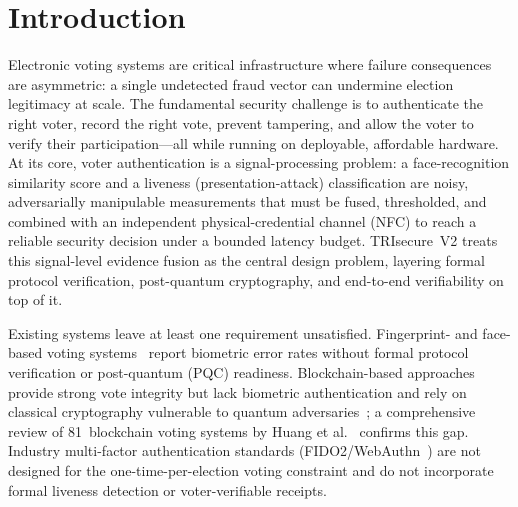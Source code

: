 \documentclass[pdflatex,sn-vancouver-num]{sn-jnl}%
\theoremstyle{thmstyleone}%
\theoremstyle{thmstyletwo}%
\theoremstyle{thmstylethree}%
\begin{document}

\maketitle

\linenumbers
\doublespacing

\section{Introduction}\label{sec:intro}

Electronic voting systems are critical infrastructure where failure
consequences are asymmetric: a single undetected fraud vector can undermine
election legitimacy at scale. The fundamental security challenge is to
authenticate the right voter, record the right vote, prevent tampering,
and allow the voter to verify their participation---all while running on
deployable, affordable hardware. At its core, voter authentication is a
signal-processing problem: a face-recognition similarity score and a
liveness (presentation-attack) classification are noisy, adversarially
manipulable measurements that must be fused, thresholded, and combined
with an independent physical-credential channel (NFC) to reach a reliable
security decision under a bounded latency budget. TRIsecure~V2 treats this
signal-level evidence fusion as the central design problem, layering
formal protocol verification, post-quantum cryptography, and end-to-end
verifiability on top of it.

Existing systems leave at least one requirement unsatisfied.
Fingerprint- and face-based voting
systems~\cite{bello2021biometric,komatineni2020biometric,nagaraj2022voting}
report biometric error rates without formal protocol verification or
post-quantum (PQC) readiness. Blockchain-based
approaches~\cite{ayed2017conceptual,hardwick2018voting,faruk2024transforming}
provide strong vote integrity but lack biometric authentication and rely on
classical cryptography vulnerable to quantum
adversaries~\cite{bernstein2017post}; a comprehensive review of 81~blockchain
voting systems by Huang et al.~\cite{huang2022blockchain_voting} confirms this
gap. Industry multi-factor authentication standards
(FIDO2/WebAuthn~\cite{fido2_webauthn}) are not designed for the
one-time-per-election voting constraint and do not incorporate formal liveness
detection or voter-verifiable receipts.
\end{document}

